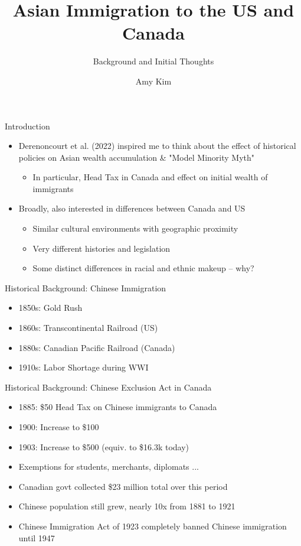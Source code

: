\documentclass[pdf]{beamer}
\title{Asian Immigration to the US and Canada}
\subtitle{Background and Initial Thoughts}
\author{Amy Kim}
\begin{document}
\begin{frame}
    \titlepage
\end{frame}

\begin{frame}{Introduction}
    \begin{itemize}
        \item Derenoncourt et al. (2022) inspired me to think about the effect of historical policies on Asian wealth accumulation & "Model Minority Myth"
        \begin{itemize}
            \item In particular, Head Tax in Canada and effect on initial wealth of immigrants
        \end{itemize}
        \pause
        \item Broadly, also interested in differences between Canada and US
        \begin{itemize}
            \item Similar cultural environments with geographic proximity
            \item Very different histories and legislation
            \item Some distinct differences in racial and ethnic makeup -- why?
        \end{itemize}
    \end{itemize}
\end{frame}

\begin{frame}{Historical Background: Chinese Immigration}
    \begin{itemize}
        \item 1850s: Gold Rush
        \item 1860s: Transcontinental Railroad (US)
        \item 1880s: Canadian Pacific Railroad (Canada)
        \item 1910s: Labor Shortage during WWI
    \end{itemize}
\end{frame}

\begin{frame}{Historical Background: Chinese Exclusion Act in Canada}
    \begin{itemize}
        \item 1885: \$50 Head Tax on Chinese immigrants to Canada 
        \item 1900: Increase to \$100
        \item 1903: Increase to \$500 (equiv. to \$16.3k today)
        \item Exemptions for students, merchants, diplomats ...
        \item Canadian govt collected \$23 million total over this period
        \item Chinese population still grew, nearly 10x from 1881 to 1921
        \item Chinese Immigration Act of 1923 completely banned Chinese immigration until 1947
    \end{itemize}
\end{frame}
\end{document}
